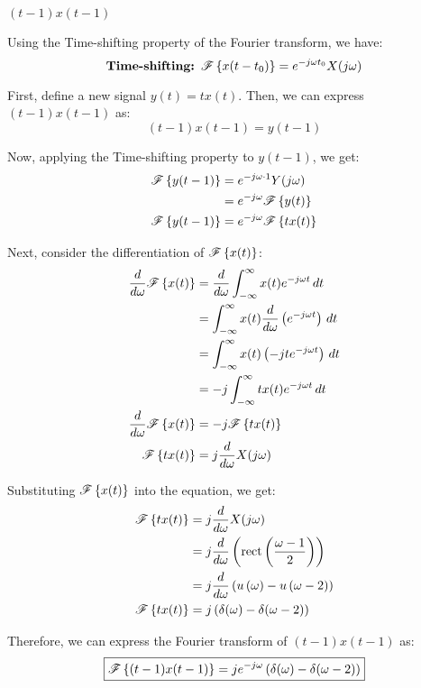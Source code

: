 \documentclass[a4paper, 10pt]{article}
\begin{document}
\newpage

\begin{tosubmit}
\begin{subproblems}[start=2]
    \item \( (t-1)x(t-1) \)
\end{subproblems}

\par\noindent\submitsolution
Using the Time-shifting property of the Fourier transform, we have:
\[
    \textbf{Time-shifting: } \mathscr{F} \left\{ x(t - t_0) \right\} = e^{-j\omega t_0} X(j\omega)
\]

First, define a new signal \( y(t) = tx(t) \). Then, we can express \( (t-1)x(t-1) \) as:
\[
    (t-1)x(t-1) = y(t-1)
\]

Now, applying the Time-shifting property to \( y(t-1) \), we get:
\begin{align*}  
    \mathscr{F} \left\{ y(t-1) \right\} &= e^{-j\omega \cdot 1} Y(j\omega) \\
    &= e^{-j\omega} \mathscr{F} \left\{ y(t) \right\} \\
    \mathscr{F} \left\{ y(t-1) \right\} &= e^{-j\omega} \mathscr{F} \left\{ tx(t) \right\}
\end{align*}

Next, consider the differentiation of \( \mathscr{F} \left\{ x(t) \right\} \):
\begin{align*}
    \frac{d}{d\omega} \mathscr{F} \left\{ x(t) \right\} &= \frac{d}{d\omega} \int_{-\infty}^{\infty} x(t) e^{-j\omega t} \,dt \\
    &= \int_{-\infty}^{\infty} x(t) \frac{d}{d\omega} \left( e^{-j\omega t} \right) \,dt \\
    &= \int_{-\infty}^{\infty} x(t) \left( -jt e^{-j\omega t} \right) \,dt \\
    &= -j \int_{-\infty}^{\infty} t x(t) e^{-j\omega t} \,dt \\
    \frac{d}{d\omega} \mathscr{F} \left\{ x(t) \right\}  &= -j \mathscr{F} \left\{ t x(t) \right\} \\
    \mathscr{F} \left\{ t x(t) \right\}  &= j \frac{d}{d\omega} X(j\omega)
\end{align*}

Substituting \( \mathscr{F} \left\{ x(t) \right\} \) into the equation, we get:
\begin{align*}  
    \mathscr{F} \left\{ tx(t) \right\} &= j \frac{d}{d\omega} X(j\omega) \\
    &= j \frac{d}{d\omega} \left( \textrm{rect} \left( \frac{\omega - 1}{2} \right) \right) \\
    &= j \frac{d}{d\omega} \left( u\left( \omega \right) - u\left( \omega - 2 \right) \right) \\
    \mathscr{F} \left\{ tx(t) \right\} &= j \left( \delta(\omega) - \delta(\omega - 2) \right)
\end{align*}

Therefore, we can express the Fourier transform of \( (t-1)x(t-1) \) as:
\[ \boxed{
    \mathscr{F} \left\{ (t-1)x(t-1) \right\} = j e^{-j\omega} \left( \delta(\omega) - \delta(\omega - 2) \right)
} \]
\end{tosubmit}
\end{document}
